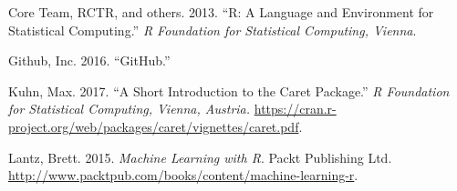 \documentclass[
]{article}
\begin{document}
\hypertarget{refs}{}
\leavevmode\hypertarget{ref-core2013r}{}%
Core Team, RCTR, and others. 2013. ``R: A Language and Environment for
Statistical Computing.'' \emph{R Foundation for Statistical Computing,
Vienna}.

\leavevmode\hypertarget{ref-github2016github}{}%
Github, Inc. 2016. ``GitHub.''

\leavevmode\hypertarget{ref-kuhn2017caret}{}%
Kuhn, Max. 2017. ``A Short Introduction to the Caret Package.'' \emph{R
Foundation for Statistical Computing, Vienna, Austria.}
\url{https://cran.r-project.org/web/packages/caret/vignettes/caret.pdf}.

\leavevmode\hypertarget{ref-lantz2015machine}{}%
Lantz, Brett. 2015. \emph{Machine Learning with R}. Packt Publishing
Ltd. \url{http://www.packtpub.com/books/content/machine-learning-r}.
\end{document}
